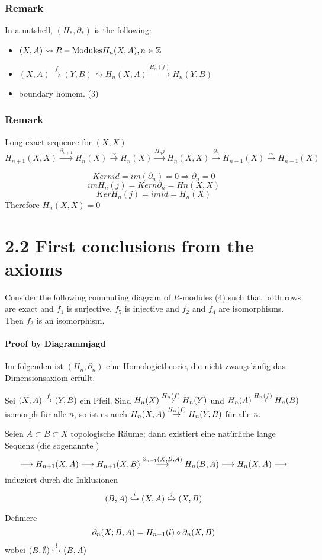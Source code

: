 \subsubsection{Remark}
In a nutshell, $(H_*, \partial_*)$ is the following:
\begin{itemize}
	\item $(X,A) \rightsquigarrow R-\text{Modules} H_n(X,A), n \in \mathbb{Z}$
	\item $(X,A) \overset{f}{\rightarrow} (Y,B) \rightsquigarrow H_n(X,A) \overset{H_n(f)}{\rightarrow} H_n(Y,B)$
	\item boundary homom. (3)
\end{itemize}

\subsubsection{Remark}
Long exact sequence for $(X,X)$
\[H_{n+1}(X,X) \overset{\partial_{n+1}}{\longrightarrow} H_n(X) \overset{\sim}{\longrightarrow} H_n(X) \overset{H_nj}{\longrightarrow} H_n(X,X)\overset{\partial_{n}}{\longrightarrow} H_{n-1}(X) \overset{\sim}{\longrightarrow} H_{n-1}(X)  \]

\[Kern id = im(\partial_n) = 0 \Longrightarrow \partial_n = 0 \]
\[im H_n(j) = Kern \partial_n = Hn(X,X)\]
\[Ker H_n(j) = im id = H_n(X) \]
Therefore $H_n(X,X) = 0$

\section{2.2 First conclusions from the axioms}
Consider the following commuting diagram of $R$-modules
(4)
such that both rows are exact and $f_1$ is surjective, $f_5$ is injective and $f_2$ and $f_4$ are isomorphisms. Then $f_3$ is an isomorphism.

\paragraph{Proof by Diagrammjagd}


Im folgenden ist $(H_n,\partial_n)$ eine Homologietheorie, die nicht zwangsläufig das Dimensionsaxiom erfüllt.

\Kor{}
Sei $(X,A) \overset{f}{\rightarrow} (Y,B)$ ein Pfeil. Sind $H_n(X) \overset{H_n(f)}{\rightarrow} H_n(Y)$ und $H_n(A) \overset{H_n(f)}{\rightarrow} H_n(B)$ isomorph für alle $n$, so ist es auch $H_n(X,A) \overset{H_n(f)}{\rightarrow} H_n(Y,B)$ für alle $n$.

\Lem{}
Seien $A \subset B \subset X$ topologische Räume; dann existiert eine natürliche lange Sequenz (die sogenannte )
\[\overset{}{\longrightarrow} H_{n+1}(X,A) \overset{}{\longrightarrow} H_{n+1}(X,B) \overset{\partial_{n+1}(X;B,A)}{\longrightarrow} H_n(B, A) \overset{}{\longrightarrow} H_n(X,A) \overset{}{\longrightarrow} \]
induziert durch die Inklusionen
\[ (B, A) \overset{i}{\hookrightarrow} (X,A) \overset{j}{\hookrightarrow} (X,B) \]
\begin{Beweis}{}
Definiere
\[\partial_n(X;B,A) = H_{n-1}(l) \circ \partial_n(X, B) \]
wobei $(B,\emptyset) \overset{l}{\hookrightarrow} (B,A) $
\end{Beweis}

